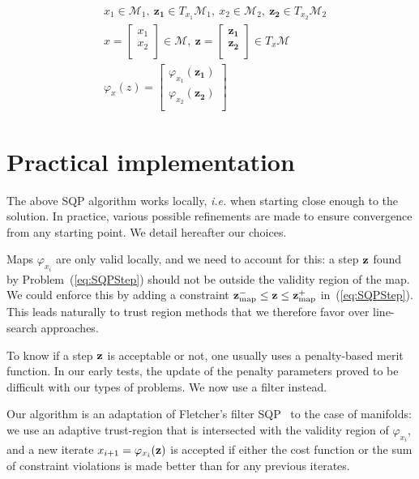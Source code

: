 \begin{align}
  &x_1\in \mathcal{M}_1,\ \mathbf{z_1}\in T_{x_1}\mathcal{M}_1,\ x_2\in \mathcal{M}_2,\ \mathbf{z_2}\in T_{x_2}\mathcal{M}_2\\
  &x=\begin{bmatrix}
    x_1\\x_2\\
  \end{bmatrix}\in \mathcal{M},\ \mathbf{z}=\begin{bmatrix}
    \mathbf{z_1}\\ \mathbf{z_2}\\
  \end{bmatrix}\in T_x\mathcal{M}\\
  &\varphi_x(z) = \begin{bmatrix}
    \varphi_{x_1}(\mathbf{z_1})\\
    \varphi_{x_2}(\mathbf{z_2})\\
  \end{bmatrix}
\end{align}


\section{Practical implementation}
\label{sec:practical_implementation}

The above SQP algorithm works locally, \emph{i.e.} when starting close enough to the solution.
In practice, various possible refinements are made to ensure convergence from any starting point.
We detail hereafter our choices.

Maps $\varphi_{x_i}$ are only valid locally, and we need to account for this: a step ${\bf z}$ found by Problem~(\ref{eq:SQPStep}) should not be outside the validity region of the map.
We could enforce this by adding a constraint ${\bf z}_{\text{map}}^- \leq {\bf z} \leq {\bf z}_{\text{map}}^+$ in~(\ref{eq:SQPStep}).
This leads naturally to trust region methods that we therefore favor over line-search approaches.

To know if a step ${\bf z}$ is acceptable or not, one usually uses a penalty-based merit function.
In our early tests, the update of the penalty parameters proved to be difficult with our types of problems.
We now use a filter instead.

Our algorithm is an adaptation of Fletcher's filter SQP~\cite{fletcher:mathprog:2000} to the case of manifolds: we use an adaptive trust-region that is intersected with the validity region of $\varphi_{x_i}$, and a new iterate $x_{i+1} = \varphi_{x_i}({\bf z})$ is accepted if either the cost function or the sum of constraint violations is made better than for any previous iterates.

